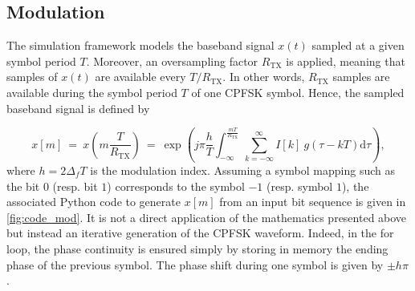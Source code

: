 \subsection{Modulation}
The simulation framework models the baseband signal $x(t)$ sampled at a given symbol period $T$. Moreover, an oversampling factor $R_{\text{TX}}$ is applied, meaning that samples of $x(t) $ are available every $T/R_{\text{TX}}$. In other words, $R_{\text{TX}}$ samples are available during the symbol period $T$ of one CPFSK symbol. Hence, the sampled baseband signal is defined by

\begin{equation*}
    x[m] \:=\:x\left(m\frac{T}{R_{\text{TX}}}\right)\:=\:\exp \left(j\pi \frac{h}{T} \int_{-\infty}^{\frac{mT}{R_{\text{TX}}}} \sum_{k=-\infty}^{\infty}I[k]\:g(\tau-kT) \text{d}\tau \right),
\end{equation*}
where $h=2 \Delta_f T$ is the modulation index.
Assuming a symbol mapping such as the bit $0$ (resp. bit $1$) corresponds to the symbol $-1$ (resp. symbol $1$), the associated Python code to generate $x[m]$ from an input bit sequence is given in \autoref{fig:code_mod}. It is not a direct application of the mathematics presented above but instead an iterative generation of the CPFSK waveform. Indeed, in the for loop, the phase continuity is ensured simply by storing in memory the ending phase of the previous symbol. The phase shift during one symbol is given by $\pm h\pi$.

